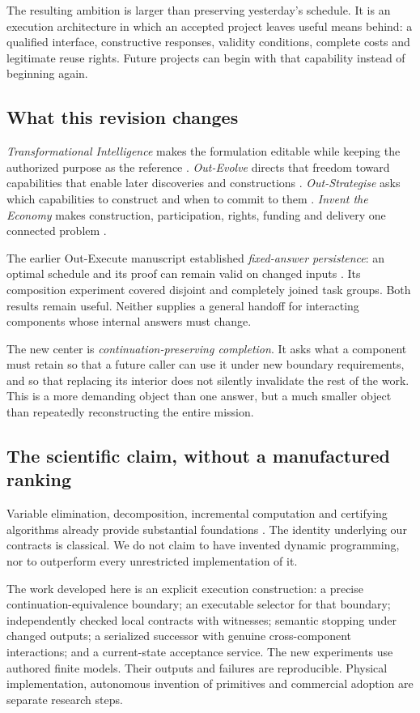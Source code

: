 \documentclass[11pt,letterpaper]{article}
\theoremstyle{definition}\newtheorem{definition}[theorem]{Definition}
\theoremstyle{remark}\newtheorem{remark}[theorem]{Remark}
\newcommand{\Out}{\textsf{Out-Execute}}
\begin{document}
The resulting ambition is larger than preserving yesterday's schedule. It is an execution architecture in which an accepted project leaves useful means behind: a qualified interface, constructive responses, validity conditions, complete costs and legitimate reuse rights. Future projects can begin with that capability instead of beginning again.

\subsection{What this revision changes}
\emph{Transformational Intelligence} makes the formulation editable while keeping the authorized purpose as the reference \citep{ti}. \emph{Out-Evolve} directs that freedom toward capabilities that enable later discoveries and constructions \citep{evolve}. \emph{Out-Strategise} asks which capabilities to construct and when to commit to them \citep{strategise}. \emph{Invent the Economy} makes construction, participation, rights, funding and delivery one connected problem \citep{economy}.

The earlier \Out{} manuscript established \emph{fixed-answer persistence}: an optimal schedule and its proof can remain valid on changed inputs \citep{execute1}. Its composition experiment covered disjoint and completely joined task groups. Both results remain useful. Neither supplies a general handoff for interacting components whose internal answers must change.

The new center is \emph{continuation-preserving completion}. It asks what a component must retain so that a future caller can use it under new boundary requirements, and so that replacing its interior does not silently invalidate the rest of the work. This is a more demanding object than one answer, but a much smaller object than repeatedly reconstructing the entire mission.

\subsection{The scientific claim, without a manufactured ranking}
Variable elimination, decomposition, incremental computation and certifying algorithms already provide substantial foundations \citep{dechter,bodlaender,acar,certifying}. The identity underlying our contracts is classical. We do not claim to have invented dynamic programming, nor to outperform every unrestricted implementation of it.

The work developed here is an explicit execution construction: a precise continuation-equivalence boundary; an executable selector for that boundary; independently checked local contracts with witnesses; semantic stopping under changed outputs; a serialized successor with genuine cross-component interactions; and a current-state acceptance service. The new experiments use authored finite models. Their outputs and failures are reproducible. Physical implementation, autonomous invention of primitives and commercial adoption are separate research steps.
\end{document}
